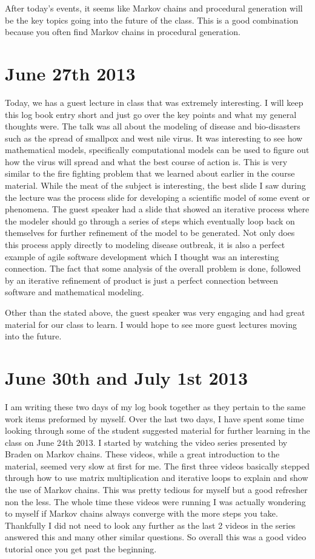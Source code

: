 \documentclass[conference]{IEEEtran}
\begin{document}
After today's events, it seems like Markov chains and procedural generation will be the key topics going into
the future of the class. This is a good combination because you often find Markov chains in procedural generation.

\section{June 27th 2013}
Today, we has a guest lecture in class that was extremely interesting. I will keep this log book entry short
and just go over the key points and what my general thoughts were. The talk was all about the modeling of disease
and bio-disasters such as the spread of smallpox and west nile virus. It was interesting to see how mathematical
models, specifically computational models can be used to figure out how the virus will spread and what the best
course of action is. This is very similar to the fire fighting problem that we learned about earlier in the course
material. While the meat of the subject is interesting, the best slide I saw during the lecture was the process
slide for developing a scientific model of some event or phenomena. The guest speaker had a slide that showed an
iterative process where the modeler should go through a series of steps which eventually loop back on themselves
for further refinement of the model to be generated. Not only does this process apply directly to modeling
disease outbreak, it is also a perfect example of agile software development which I thought was an interesting
connection. The fact that some analysis of the overall problem is done, followed by an iterative refinement of
product is just a perfect connection between software and mathematical modeling. 

Other than the stated above, the guest speaker was very engaging and had great material for our class to learn.
I would hope to see more guest lectures moving into the future.

\section{June 30th and July 1st 2013}
I am writing these two days of my log book together as they pertain to the same work items preformed by myself.
Over the last two days, I have spent some time looking through some of the student suggested material for further
learning in the class on June 24th 2013. I started by watching the video series presented by Braden on Markov chains.
These videos, while a great introduction to the material, seemed very slow at first for me. The first three videos
basically stepped through how to use matrix multiplication and iterative loops to explain and show the use of
Markov chains. This was pretty tedious for myself but a good refresher non the less. The whole time these videos
were running I was actually wondering to myself if Markov chains always converge with the more steps you take.
Thankfully I did not need to look any further as the last 2 videos in the series answered this and many other
similar questions. So overall this was a good video tutorial once you get past the beginning.
\end{document}
